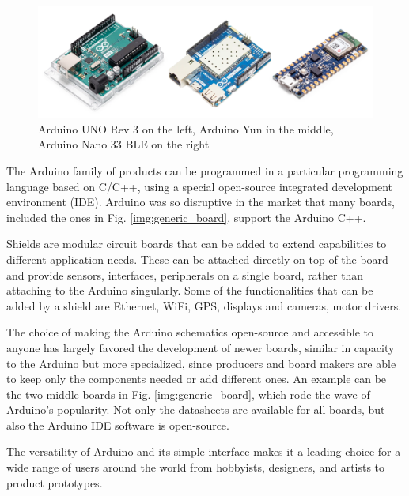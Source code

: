 		\begin{figure}
			\centering
			\includegraphics[width=\textwidth]{resources/img/chap3/arduino_types}
			\caption{Arduino UNO Rev 3 on the left, Arduino Yun in the middle, Arduino Nano 33 BLE on the right}
			\label{img:arduino_board}
		\end{figure}
		
		The Arduino family of products can be programmed in a particular programming language based on C/C++, using a special open-source integrated development environment (IDE).
		Arduino was so disruptive in the market that many boards, included the ones in Fig. \ref{img:generic_board}, support the Arduino C++.

		Shields are modular circuit boards that can be added to extend capabilities to different application needs.
		These can be attached directly on top of the board and provide sensors, interfaces, peripherals on a single board, rather than attaching to the Arduino singularly.
		Some of the functionalities that can be added by a shield are Ethernet, WiFi, GPS, displays and cameras, motor drivers.
		
		The choice of making the Arduino schematics open-source and accessible to anyone has largely favored the development of newer boards, similar in capacity to the Arduino but more specialized, since producers and board makers are able to keep only the components needed or add different ones.
		An example can be the two middle boards in Fig. \ref{img:generic_board}, which rode the wave of Arduino's popularity.
		Not only the datasheets are available for all boards, but also the Arduino IDE software is open-source.
		
		The versatility of Arduino and its simple interface makes it a leading choice for a wide range of users around the world from hobbyists, designers, and artists to product prototypes. 
		
